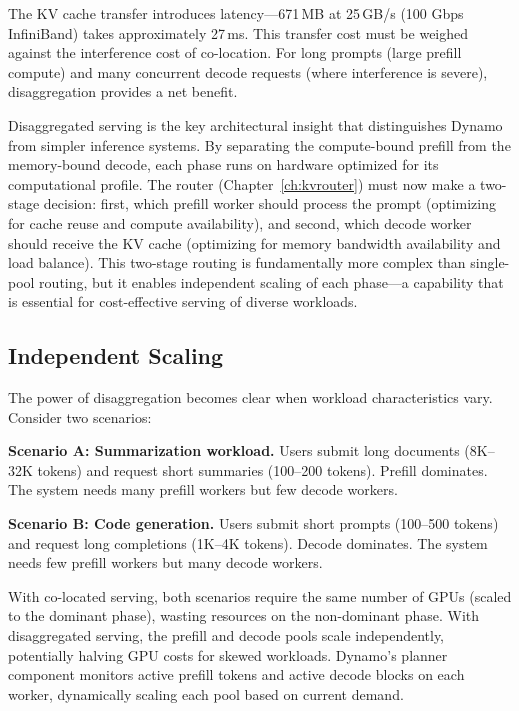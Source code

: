 %
The KV cache transfer introduces latency---671\,MB at 25\,GB/s (100 Gbps InfiniBand) takes approximately 27\,ms. This transfer cost must be weighed against the interference cost of co-location. For long prompts (large prefill compute) and many concurrent decode requests (where interference is severe), disaggregation provides a net benefit.

\begin{insightbox}
Disaggregated serving is the key architectural insight that distinguishes Dynamo from simpler inference systems. By separating the compute-bound prefill from the memory-bound decode, each phase runs on hardware optimized for its computational profile. The router (Chapter~\ref{ch:kvrouter}) must now make a two-stage decision: first, which prefill worker should process the prompt (optimizing for cache reuse and compute availability), and second, which decode worker should receive the KV cache (optimizing for memory bandwidth availability and load balance). This two-stage routing is fundamentally more complex than single-pool routing, but it enables independent scaling of each phase---a capability that is essential for cost-effective serving of diverse workloads.
\end{insightbox}

\subsection{Independent Scaling}

The power of disaggregation becomes clear when workload characteristics vary. Consider two scenarios:

\textbf{Scenario A: Summarization workload.} Users submit long documents (8K--32K tokens) and request short summaries (100--200 tokens). Prefill dominates. The system needs many prefill workers but few decode workers.

\textbf{Scenario B: Code generation.} Users submit short prompts (100--500 tokens) and request long completions (1K--4K tokens). Decode dominates. The system needs few prefill workers but many decode workers.

With co-located serving, both scenarios require the same number of GPUs (scaled to the dominant phase), wasting resources on the non-dominant phase. With disaggregated serving, the prefill and decode pools scale independently, potentially halving GPU costs for skewed workloads. Dynamo's planner component monitors active prefill tokens and active decode blocks on each worker, dynamically scaling each pool based on current demand.

